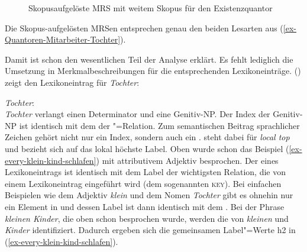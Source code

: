 \begin{figure}
\caption{Skopusaufgelöste MRS mit weitem Skopus für den Existenzquantor}\label{fig-Jede-Tochter-eines-Mitarbeiters-schläft-Existenzquantor}
\end{figure}
Die Skopus-aufgelösten MRSen entsprechen genau den beiden Lesarten aus (\ref{ex-Quantoren-Mitarbeiter-Tochter}).

Damit ist schon den wesentlichen Teil der Analyse erklärt. Es fehlt lediglich die Umsetzung
in Merkmalbeschreibungen für die entsprechenden Lexikoneinträge. 
() zeigt den Lexikoneintrag für \emph{Tochter}:

\eas
\label{le-Tochter}%
\emph{Tochter}:\\
\zs
\emph{Tochter} verlangt einen Determinator und eine Genitiv-NP. Der Index der Genitiv-NP ist
identisch mit dem \argone der "=Relation. Zum semantischen Beitrag sprachlicher
Zeichen gehört nicht nur ein Index, sondern auch ein \ltopm. \ltop steht dabei für \emph{local top}
und bezieht sich auf das lokal höchste Label. Oben wurde schon das Beispiel (\ref{ex-every-klein-kind-schlafen}) mit attributivem
Adjektiv besprochen. Der \ltopw eines Lexikoneintrags ist identisch mit dem Label der wichtigsten Relation, die von einem
Lexikoneintrag eingeführt wird (dem sogenannten \textsc{key}). Bei einfachen Beispielen wie dem
Adjektiv \emph{klein} und dem Nomen \emph{Tochter} gibt es ohnehin nur ein Element in \rels und
dessen Label ist dann identisch mit dem \ltop. Bei der Phrase \emph{kleinen Kinder}\label{page-kleinen-Kinder}, die oben schon
besprochen wurde, werden die \ltopwe von \emph{kleinen} und \emph{Kinder} identifiziert. Dadurch
ergeben sich die gemeinsamen Label"=Werte h2 in (\ref{ex-every-klein-kind-schlafen}).

